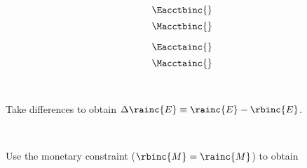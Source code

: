 

\begin{landscape}

\linespread{1}


\sectionsep{}

{
  \begin{equation}
  \Eacctbinc{}
  \end{equation}
}
{
  \begin{equation}
  \Macctbinc{}
  \end{equation}
}

\sectionsep{}

{
  \begin{equation}
  \Eacctainc{}
  \end{equation}
}
{
  \begin{equation}
  \Macctainc{}
  \end{equation}
}

\sectionsep{}

\derivsection{}
{
  ~

  Take differences to obtain $\Delta \rainc{E} \equiv \rainc{E} - \rbinc{E}$.

}
{
  ~

  Use the monetary constraint ($\rbinc{M} = \rainc{M}$) to obtain
}
\end{landscape}